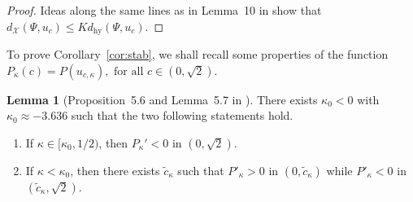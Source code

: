 \documentclass[11pt]{article}
\newcommand{\R}{\mathbb{R}}
\theoremstyle{plain}
\theoremstyle{definition}
\newtheorem{lemma}{Lemma}
\theoremstyle{remark}
\numberwithin{equation}{section}
\begin{document}
{\begin{proof}
		Ideas along the same lines as in Lemma~10 in \cite{chiron-stability} show that $d_{\mathcal{X}}(\Psi,u_c)\leq K d_{\mathrm{hy}}(\Psi,u_c)$.
	\end{proof}
	To prove Corollary~\ref{cor:stab}, we shall recall some properties of the function $P_\kappa(c)= P(u_{c,\kappa}),\text{ for all }c\in(0,\sqrt2).$ 
	\begin{lemma}[Proposition~5.6 and Lemma~5.7 in \cite{delaire2023exotic}]\label{lem:varp}
		There exists $\kappa_0<0$ with $\kappa_0\approx-3.636$ such that the two following statements hold.
		\begin{enumerate}
			\item If $\kappa \in[\kappa_0,1/2)$, then $P_\kappa'<0$ in $(0,\sqrt{2})$.
			\item If $\kappa<\kappa_0$, then there exists $\tilde{c}_\kappa$ such that $P'_\kappa>0$ in $(0,\tilde{c}_\kappa)$ while $P'_\kappa<0$ in $(\tilde{c}_\kappa,\sqrt{2})$.
		\end{enumerate}
	\end{lemma}
	\appendix
}
\end{document}
